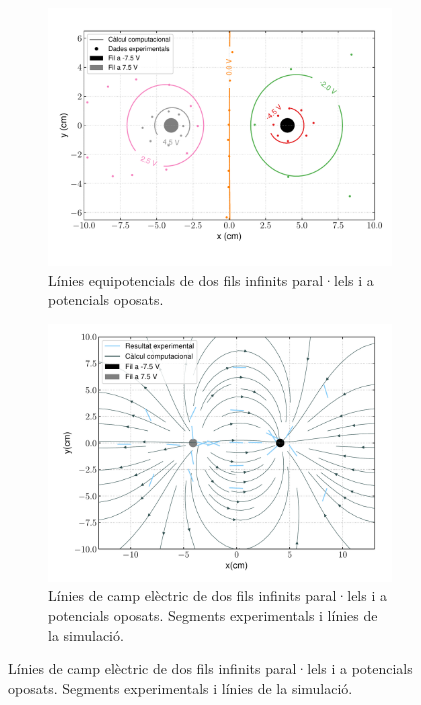 \documentclass[11pt]{article}
\numberwithin{equation}{section}
\numberwithin{figure}{section}
\numberwithin{table}{section}
\begin{document}
\begin{figure}[h]
    \centering
    \begin{subfigure}{0.495\textwidth}
        \centering
        \includegraphics[width=\textwidth]{fils_combi.pdf}
        \caption{Línies equipotencials de dos fils infinits paral·lels i a potencials oposats.}
        \label{fig: fils_pot}
    \end{subfigure}
    \begin{subfigure}{0.495\textwidth} 
        \centering
        \includegraphics[width=\textwidth]{fils_camp.pdf}
        \caption{Línies de camp elèctric de dos fils infinits paral·lels i a potencials oposats. Segments experimentals i línies de la simulació.}
        \label{fig: fils_camp}
    \end{subfigure}
\end{figure}
\end{document}
